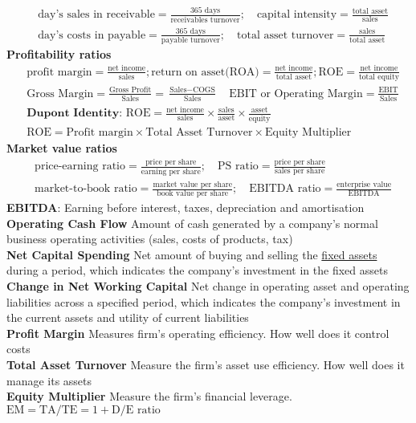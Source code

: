 \documentclass[12pt,landscape, a4paper]{article}
\theoremstyle{remark}
\begin{document}
\begin{multicols*}{3}
\begin{align*}
    &\text{day's sales in receivable} = \frac{\text{365 days}}{\text{receivables turnover}}; \quad \text{capital intensity} = \frac{\text{total asset}}{\text{sales}}\\
    &\text{day's costs in payable} = \frac{\text{365 days}}{\text{payable turnover}}; \quad \text{total asset turnover} = \frac{\text{sales}}{\text{total asset}}
\end{align*}
\textbf{Profitability ratios}
\begin{align*}
    &\text{profit margin} = \frac{\text{net income}}{\text{sales}}; \text{return on asset(ROA)} = \frac{\text{net income}}{\text{total asset}};\text{ROE} = \frac{\text{net income}}{\text{total equity}}\\
    &\text{Gross Margin} = \frac{\text{Gross Profit}}{\text{Sales}} = \frac{\text{Sales} - \text{COGS}}{\text{Sales}} \quad \text{EBIT or Operating Margin} = \frac{\text{EBIT}}{\text{Sales}}
    \\&\textbf{Dupont Identity: } \text{ROE} = \frac{\text{net income}}{\text{sales}} \times \frac{\text{sales}}{\text{asset}} \times \frac{\text{asset}}{\text{equity}}\\
    & \text{ROE} = \text{Profit margin} \times\text{Total Asset Turnover} \times \text{Equity Multiplier}
\end{align*}
\textbf{Market value ratios}
\begin{align*}
    &\text{price-earning ratio} = \frac{\text{price per share}}{\text{earning per share}}; \quad \text{PS ratio} = \frac{\text{price per share}}{\text{sales per share}}\\
    &\text{market-to-book ratio} = \frac{\text{market value per share}}{\text{book value per share}}; \quad\text{EBITDA ratio} = \frac{\text{enterprise value}}{\text{EBITDA}}
\end{align*}
\textbf{EBITDA}: Earning before interest, taxes, depreciation and amortisation\\
\textbf{Operating Cash Flow} Amount of cash generated by a company's normal business operating activities (sales, costs of products, tax)\\
\textbf{Net Capital Spending} Net amount of buying and selling the \underline{fixed assets} during a period, which indicates the company's investment in the fixed assets\\
\textbf{Change in Net Working Capital} Net change in operating asset and operating liabilities across a specified period, which indicates the company's investment in the current assets and utility of current liabilities\\
\textbf{Profit Margin} Measures firm's operating efficiency. How well does it control costs\\
\textbf{Total Asset Turnover} Measure the firm's asset use efficiency. How well does it manage its assets\\
\textbf{Equity Multiplier} Measure the firm's financial leverage. $\text{EM} = \text{TA} / \text{TE} = 1+ \text{D/E ratio}$


\end{multicols*}
\end{document}
